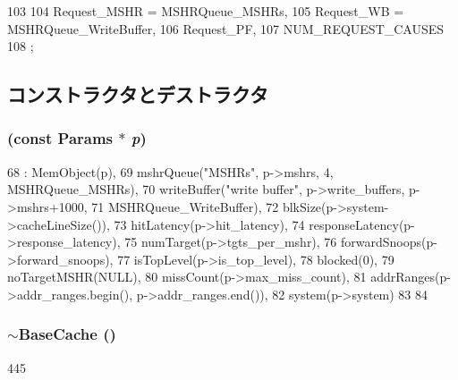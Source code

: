 \begin{DoxyCode}
103                       {
104         Request_MSHR = MSHRQueue_MSHRs,
105         Request_WB = MSHRQueue_WriteBuffer,
106         Request_PF,
107         NUM_REQUEST_CAUSES
108     };
\end{DoxyCode}


\subsection{コンストラクタとデストラクタ}
\hypertarget{classBaseCache_a6c1d60cbb9ab660c557bca8bfb40d768}{
\subsubsection[{BaseCache}]{ (const {\bf Params} $\ast$ {\em p})}}
\label{classBaseCache_a6c1d60cbb9ab660c557bca8bfb40d768}



\begin{DoxyCode}
68     : MemObject(p),
69       mshrQueue("MSHRs", p->mshrs, 4, MSHRQueue_MSHRs),
70       writeBuffer("write buffer", p->write_buffers, p->mshrs+1000,
71                   MSHRQueue_WriteBuffer),
72       blkSize(p->system->cacheLineSize()),
73       hitLatency(p->hit_latency),
74       responseLatency(p->response_latency),
75       numTarget(p->tgts_per_mshr),
76       forwardSnoops(p->forward_snoops),
77       isTopLevel(p->is_top_level),
78       blocked(0),
79       noTargetMSHR(NULL),
80       missCount(p->max_miss_count),
81       addrRanges(p->addr_ranges.begin(), p->addr_ranges.end()),
82       system(p->system)
83 {
84 }
\end{DoxyCode}
\hypertarget{classBaseCache_a9864fcb9f5632b2c250c18a2f6b9ac46}{
\subsubsection[{$\sim$BaseCache}]{\setlength{\rightskip}{0pt plus 5cm}$\sim${\bf BaseCache} ()}}
\label{classBaseCache_a9864fcb9f5632b2c250c18a2f6b9ac46}



\begin{DoxyCode}
445 {}
\end{DoxyCode}


